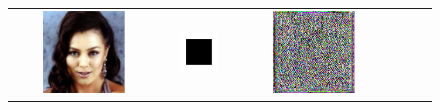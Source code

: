 \documentclass{article} %
\theoremstyle{definition}
\begin{document}
\begin{figure}[htp]
\begin{adjustbox}{max width=1.0\textwidth}
\begin{tabular}{cccccc}
\includegraphics[width=0.6\textwidth]{figures/celeba/black_init/gaussian_deblurring_FFT_clean_batch11_im0.pdf} & 
\includegraphics[width=0.6\textwidth]{figures/celeba/black_init/black.pdf} & 
\includegraphics[width=0.6\textwidth]{figures/celeba/black_init/gaussian_deblurring_FFT_ot_ode_batch11_im0_pnsr37.02.pdf} & 

\end{tabular}
\end{adjustbox}
\end{figure}
\end{document}
